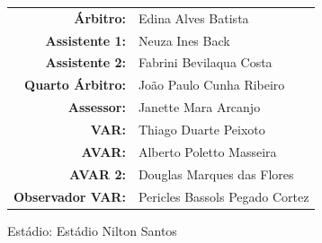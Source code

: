 \documentclass[11pt]{article}
\begin{document}
\vspace{0.5cm}
\begin{minipage}{0.65\textwidth}
\begin{center}
\begin{tabular}{rl}
\textbf{Árbitro:} & Edina Alves Batista \\
\textbf{Assistente 1:} & Neuza Ines Back \\
\textbf{Assistente 2:} & Fabrini Bevilaqua Costa \\
\textbf{Quarto Árbitro:} & João Paulo Cunha Ribeiro \\
\textbf{Assessor:} & Janette Mara Arcanjo \\
\textbf{VAR:} & Thiago Duarte Peixoto \\
\textbf{AVAR:} & Alberto Poletto Masseira \\
\textbf{AVAR 2:} & Douglas Marques das Flores \\
\textbf{Observador VAR:} & Pericles Bassols Pegado Cortez \\
\end{tabular}
\end{center}
\end{minipage}
\begin{minipage}{0.3\textwidth}
Estádio: Estádio Nilton Santos\\
\begin{tabular}{rcl}
\end{tabular}
\end{minipage}
\newpage
\end{document}
